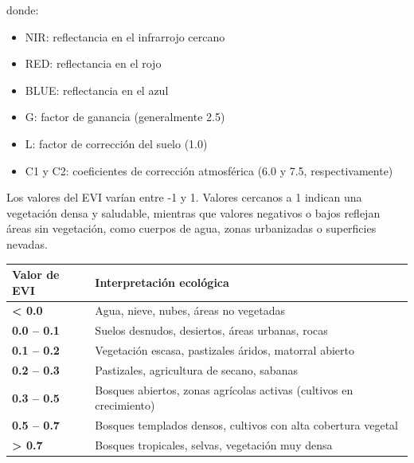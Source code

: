 \documentclass[
]{book}
\providecommand{\tightlist}{%
  \setlength{\itemsep}{0pt}\setlength{\parskip}{0pt}}
\begin{document}
donde:

\begin{itemize}
\tightlist
\item
  NIR: reflectancia en el infrarrojo cercano\\
\item
  RED: reflectancia en el rojo\\
\item
  BLUE: reflectancia en el azul\\
\item
  G: factor de ganancia (generalmente 2.5)\\
\item
  L: factor de corrección del suelo (1.0)\\
\item
  C1 y C2\hspace{0pt}: coeficientes de corrección atmosférica (6.0 y 7.5, respectivamente)
\end{itemize}

Los valores del EVI varían entre -1 y 1. Valores cercanos a 1 indican una vegetación densa y saludable, mientras que valores negativos o bajos reflejan áreas sin vegetación, como cuerpos de agua, zonas urbanizadas o superficies nevadas.

\begin{longtable}[]{@{}
  >{\raggedright\arraybackslash}p{}
  >{\centering\arraybackslash}p{}@{}}
\toprule\noalign{}
\begin{minipage}[b]{\linewidth}\raggedright
Valor de EVI
\end{minipage} & \begin{minipage}[b]{\linewidth}\centering
Interpretación ecológica
\end{minipage} \\
\midrule\noalign{}
\endhead
\bottomrule\noalign{}
\endlastfoot
\textbf{\textless{} 0.0} & Agua, nieve, nubes, áreas no vegetadas \\
\textbf{0.0 -- 0.1} & Suelos desnudos, desiertos, áreas urbanas, rocas \\
\textbf{0.1 -- 0.2} & Vegetación escasa, pastizales áridos, matorral abierto \\
\textbf{0.2 -- 0.3} & Pastizales, agricultura de secano, sabanas \\
\textbf{0.3 -- 0.5} & Bosques abiertos, zonas agrícolas activas (cultivos en crecimiento) \\
\textbf{0.5 -- 0.7} & Bosques templados densos, cultivos con alta cobertura vegetal \\
\textbf{\textgreater{} 0.7} & Bosques tropicales, selvas, vegetación muy densa \\
\end{longtable}
\end{document}
